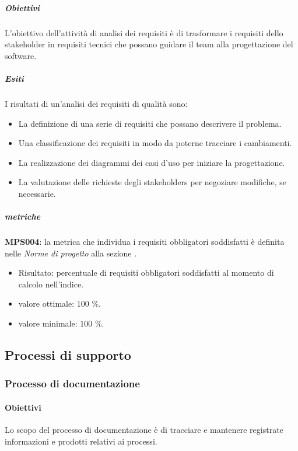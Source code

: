 \documentclass[../piano-di-qualifica.tex]{subfiles}
\begin{document}
\subparagraph{Obiettivi}%
\label{par:obiettivi}
L'obiettivo dell'attività di analisi dei requisiti è di trasformare i requisiti dello stakeholder in requisiti tecnici che possano guidare il team alla progettazione del software.

\subparagraph{Esiti}%
\label{par:esiti}
I risultati di un'analisi dei requisiti di qualità sono:
\begin{itemize}
  \item La definizione di una serie di requisiti che possano descrivere il problema.
  \item Una classificazione dei requisiti in modo da poterne tracciare i cambiamenti.
  \item La realizzazione dei diagrammi dei casi d'uso per iniziare la progettazione.
  \item La valutazione delle richieste degli stakeholders per negoziare modifiche, se necessarie.
\end{itemize}

\subparagraph{metriche}%
\label{par:metriche}

\textbf{MPS004}: la metrica che individua i requisiti obbligatori soddisfatti è definita nelle \textit{Norme di progetto} alla sezione .
\begin{itemize}
  \item Risultato: percentuale di requisiti obbligatori soddisfatti al momento di calcolo nell'indice.
  \item valore ottimale: 100 \%.
  \item valore minimale: 100 \%.
\end{itemize}

\subsection{Processi di supporto}%
\label{sub:processi_di_supporto}

\subsubsection{Processo di documentazione}%
\label{subs:processo_di_documentazione}

\paragraph{Obiettivi}%
\label{par:obiettivi}
Lo scopo del processo di documentazione è di tracciare e mantenere registrate informazioni e prodotti relativi ai processi.
\end{document}
